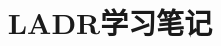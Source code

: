 \documentclass[b5paper]{ctexrep}
\author{\Large \Caffein}
\begin{document}
\title{LADR学习笔记}
\date{}
\maketitle
\tableofcontents




\end{document}
